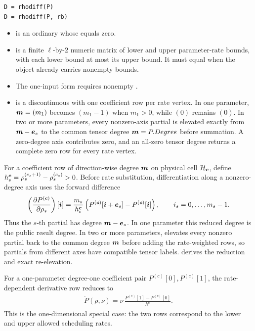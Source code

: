 \syntaxhead
\begin{lstlisting}[style=dpsyntax]
D = rhodiff(P)
D = rhodiff(P, rb)
\end{lstlisting}

\arghead
\begin{itemize}[leftmargin=*]
  \item {} is an ordinary  whose  equals zero. \item {} is a finite $\ell$-by-$2$ numeric matrix of lower and upper parameter-rate bounds, with each lower bound at most its upper bound. It must equal  when the object already carries nonempty bounds. \item The one-input form  requires nonempty . \item {} is a discontinuous  with one coefficient row per rate vertex. In one parameter, $\boldsymbol{m}=(m_1)$ becomes $(m_1-1)$ when $m_1>0$, while $(0)$ remains $(0)$. In two or more parameters, every nonzero-axis partial is elevated exactly from $\boldsymbol{m}-\boldsymbol{e}_s$ to the common tensor degree $\boldsymbol{m}=P.Degree$ before summation. A zero-degree axis contributes zero, and an all-zero tensor degree returns a complete zero row for every rate vertex.
\end{itemize}

For a coefficient row of direction-wise degree $\boldsymbol{m}$ on physical cell $\mathcal H_{\boldsymbol{c}}$, define $h_s^{\boldsymbol{c}}=\rho_s^{(c_s+1)}-\rho_s^{(c_s)}>0$. Before rate substitution, differentiation along a nonzero-degree axis uses the forward difference
\begin{gather*}
\left(\frac{\partial P^{(\boldsymbol{c})}}{\partial\rho_s}\right)[\boldsymbol{i}]
=\frac{m_s}{h_s^{\boldsymbol{c}}}
\left(P^{(\boldsymbol{c})}[\boldsymbol{i}+\boldsymbol{e}_s]-P^{(\boldsymbol{c})}[\boldsymbol{i}]\right),
\qquad i_s=0,\ldots,m_s-1.
\end{gather*}
Thus the $s$-th partial has degree $\boldsymbol{m}-\boldsymbol{e}_s$. In one parameter this reduced degree is the public result degree. In two or more parameters,  elevates every nonzero partial back to the common degree $\boldsymbol{m}$ before adding the rate-weighted rows, so partials from different axes have compatible tensor labels.  derives the reduction and exact re-elevation.

For a one-parameter degree-one coefficient pair $P^{(c)}[0],P^{(c)}[1]$, the rate-dependent derivative row reduces to
\begin{gather*}
  \dot P(\rho,\nu)
=\nu\,\frac{P^{(c)}[1]-P^{(c)}[0]}{h_1^c}.
\end{gather*}
This is the one-dimensional special case: the two rows correspond to the lower and upper allowed scheduling rates.

